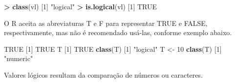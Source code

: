 \documentclass[]{book}
\newenvironment{Shaded}{\begin{snugshade}}{\end{snugshade}}
\newcommand{\KeywordTok}[1]{\textcolor[rgb]{0.13,0.29,0.53}{\textbf{#1}}}
\newcommand{\DecValTok}[1]{\textcolor[rgb]{0.00,0.00,0.81}{#1}}
\newcommand{\StringTok}[1]{\textcolor[rgb]{0.31,0.60,0.02}{#1}}
\newcommand{\OtherTok}[1]{\textcolor[rgb]{0.56,0.35,0.01}{#1}}
\newcommand{\OperatorTok}[1]{\textcolor[rgb]{0.81,0.36,0.00}{\textbf{#1}}}
\newcommand{\NormalTok}[1]{#1}
\begin{document}
\begin{Shaded}
\begin{Highlighting}[]
\OperatorTok{>}\StringTok{ }\KeywordTok{class}\NormalTok{(vl)}
\NormalTok{[}\DecValTok{1}\NormalTok{] }\StringTok{"logical"}
\OperatorTok{>}\StringTok{ }\KeywordTok{is.logical}\NormalTok{(vl)}
\NormalTok{[}\DecValTok{1}\NormalTok{] }\OtherTok{TRUE}
\end{Highlighting}
\end{Shaded}

O R aceita as abreviaturas T e F para representar TRUE e FALSE,
respectivamente, mas não é recomendado usá-las, conforme exemplo abaixo.

\begin{Shaded}
\begin{Highlighting}[]
\OtherTok{TRUE}
\NormalTok{[}\DecValTok{1}\NormalTok{] }\OtherTok{TRUE}
\NormalTok{T}
\NormalTok{[}\DecValTok{1}\NormalTok{] }\OtherTok{TRUE}
\KeywordTok{class}\NormalTok{(T)}
\NormalTok{[}\DecValTok{1}\NormalTok{] }\StringTok{"logical"}
\NormalTok{T <-}\StringTok{ }\DecValTok{10}
\KeywordTok{class}\NormalTok{(T)}
\NormalTok{[}\DecValTok{1}\NormalTok{] }\StringTok{"numeric"}
\end{Highlighting}
\end{Shaded}

Valores lógicos resultam da comparação de números ou caracteres.
\end{document}
